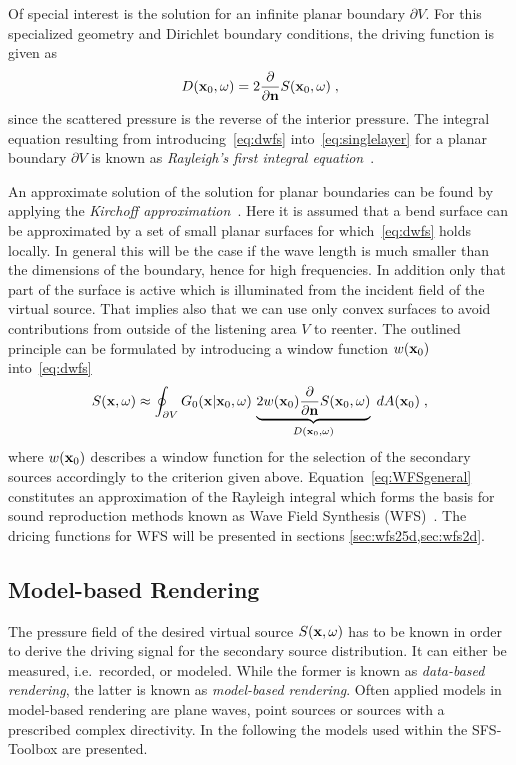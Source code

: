 \documentclass{article}
\begin{document}
Of special interest is the solution for an infinite planar
boundary $\partial V$.
For this specialized geometry and Dirichlet boundary conditions, the driving function is
given as~\cite{Williams1999}
\begin{equation}
    D(  \mathbf{x}  _0,\omega) = 2 \frac{\partial}{\partial   \mathbf{n}  } S(  \mathbf{x}  _0,\omega)\;,
    \label{eq:dwfs}
\end{equation}
since the scattered pressure is the reverse of the interior pressure.
The integral equation resulting from introducing~\eqref{eq:dwfs} into~\eqref{eq:singlelayer}
for a planar boundary $\partial V$ is known as {\em Rayleigh's first integral
equation}~\cite{Williams1999}.

An approximate solution of the solution for planar boundaries can be found by applying the
\emph{Kirchoff approximation}~\cite{Colton83:Book}. Here it is assumed that a bend surface can be
approximated by a set of small planar surfaces for which~\eqref{eq:dwfs} holds locally.
In general this will be the case if the wave length is much smaller than the
dimensions of the boundary,
hence for high frequencies. In addition only that part of the surface is active
which is illuminated from the incident field of the virtual source. That implies also that
we can use only convex surfaces to avoid contributions from outside of the listening
area $V$ to reenter. The outlined principle can be formulated by introducing a window function
$w(  \mathbf{x}  _0)$ into~\eqref{eq:dwfs}
\begin{equation}
S(  \mathbf{x}  ,\omega) \approx \oint_{\partial V}  G_0(  \mathbf{x}  |  \mathbf{x}  _0,\omega) \, \underbrace{2 w(  \mathbf{x}  _0)
\frac{\partial}{\partial   \mathbf{n}  } S(  \mathbf{x}  _0,\omega)}_{D(  \mathbf{x}  _0,\omega)} \; d A(  \mathbf{x}  _0) \;,
\label{eq:WFSgeneral}
\end{equation}
where $w(  \mathbf{x}  _0)$ describes a window function for the selection of the secondary sources
accordingly to the criterion given above. Equation~\eqref{eq:WFSgeneral} constitutes
an approximation of the Rayleigh integral which forms the basis for sound
reproduction methods known as Wave Field Synthesis
(WFS)~\cite{Berkhout1988,Verheijen1997,Start1997,Spors2008}. The dricing functions
for WFS will be presented in sections \ref{sec:wfs25d,sec:wfs2d}.

\subsection{Model-based Rendering}
\label{sec:modelbasedrendering}
%
The pressure field of the desired virtual source $S(  \mathbf{x}  ,\omega)$ has to be known
in order to derive the driving signal for the secondary source distribution.
It can either be measured, i.e.~recorded, or modeled. While the former is known as
{\em data-based rendering}, the latter is known as {\em model-based rendering}.
Often applied models in model-based rendering are plane waves, point sources or
sources with a prescribed complex directivity.
In the following the models used within the SFS-Toolbox are presented.
\end{document}
